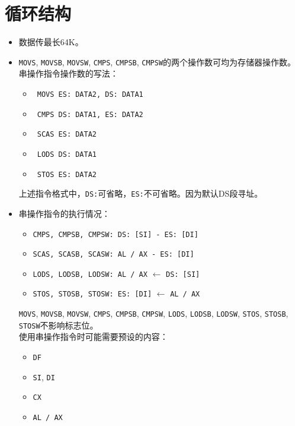 \documentclass{article}
\begin{document}
\begin{CJK*}{UTF8}{gbsn}
\begin{itemize}
\end{itemize}

\section{循环结构}

\begin{itemize}

\item
数据传最长64K。 \\

\item
\verb|MOVS|, \verb|MOVSB|, \verb|MOVSW|, \verb|CMPS|, \verb|CMPSB|, \verb|CMPSW|的两个操作数可均为存储器操作数。 \\
串操作指令操作数的写法：
\begin{itemize}
\item \verb| MOVS ES: DATA2, DS: DATA1 |
\item \verb| CMPS DS: DATA1, ES: DATA2 |
\item \verb| SCAS ES: DATA2 |
\item \verb| LODS DS: DATA1 |
\item \verb| STOS ES: DATA2 |
\end{itemize}
上述指令格式中，\verb|DS:|可省略，\verb|ES:|不可省略。因为默认DS段寻址。 \\

\item
串操作指令的执行情况：
\begin{itemize}
\item \verb|CMPS, CMPSB, CMPSW: DS: [SI] - ES: [DI]|
\item \verb|SCAS, SCASB, SCASW: AL / AX - ES: [DI]|
\item \verb|LODS, LODSB, LODSW: AL / AX| $\leftarrow$ \verb|DS: [SI]|
\item \verb|STOS, STOSB, STOSW: ES: [DI]| $\leftarrow$ \verb|AL / AX|
\end{itemize}
\verb|MOVS|, \verb|MOVSB|, \verb|MOVSW|, \verb|CMPS|, \verb|CMPSB|, \verb|CMPSW|, \verb|LODS|, \verb|LODSB|, \verb|LODSW|, \verb|STOS|, \verb|STOSB|, \verb|STOSW|不影响标志位。 \\
使用串操作指令时可能需要预设的内容：
\begin{itemize}
\item \verb|DF|
\item \verb|SI|, \verb|DI|
\item \verb|CX|
\item \verb|AL / AX|
\end{itemize}


\end{itemize}
\end{CJK*}
\end{document}
